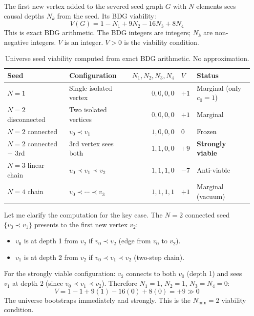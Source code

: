 \documentclass[12pt,a4paper]{article}
\begin{document}
The first new vertex added to the severed seed graph $G$ with $N$ elements sees causal depths $N_k$ from the seed.  Its BDG viability:
\begin{equation}
  V(G) = 1 - N_1 + 9N_2 - 16N_3 + 8N_4
  \label{eq:viability}
\end{equation}
This is exact BDG arithmetic.  The BDG integers are integers; $N_k$ are non-negative integers.  $V$ is an integer.  $V>0$ is the viability condition.

\begin{table}[ht]
\centering
\caption{Universe seed viability computed from exact BDG arithmetic.  No approximation.}
\label{tab:seeds}
\begin{tabular}{llrll}
\toprule
Seed & Configuration & $N_1,N_2,N_3,N_4$ & $V$ & Status \\
\midrule
$N=1$ & Single isolated vertex & $0,0,0,0$ & $+1$ & Marginal (only $c_0=1$) \\
$N=2$ disconnected & Two isolated vertices & $0,0,0,0$ & $+1$ & Marginal \\
$N=2$ connected & $v_0\prec v_1$ & $1,0,0,0$ & $0$ & Frozen \\
$N=2$ connected + 3rd & 3rd vertex sees both & $1,1,0,0$ & $+9$ & \textbf{Strongly viable} \\
$N=3$ linear chain & $v_0\prec v_1\prec v_2$ & $1,1,1,0$ & $-7$ & Anti-viable \\
$N=4$ chain & $v_0\prec\cdots\prec v_3$ & $1,1,1,1$ & $+1$ & Marginal (vacuum) \\
\bottomrule
\end{tabular}
\end{table}

Let me clarify the computation for the key case.  The $N=2$ connected seed $\{v_0\prec v_1\}$ presents to the first new vertex $v_2$:
\begin{itemize}
  \item $v_0$ is at depth 1 from $v_2$ if $v_0\prec v_2$ (edge from $v_0$ to $v_2$).
  \item $v_1$ is at depth 2 from $v_2$ if $v_0\prec v_1\prec v_2$ (two-step chain).
\end{itemize}
For the strongly viable configuration: $v_2$ connects to both $v_0$ (depth 1) and sees $v_1$ at depth 2 (since $v_0\prec v_1\prec v_2$).  Therefore $N_1=1$, $N_2=1$, $N_3=N_4=0$:
\begin{equation}
  V = 1 - 1 + 9(1) - 16(0) + 8(0) = +9 \gg 0
  \label{eq:V9}
\end{equation}
The universe bootstraps immediately and strongly.  This is the $N_{\min}=2$ viability condition.
\end{document}
